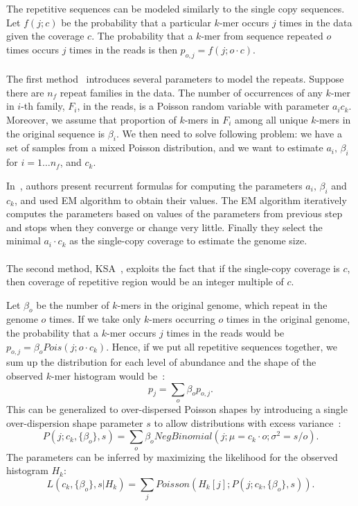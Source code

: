 The repetitive sequences can be modeled similarly to the single copy sequences. Let $f(j; c)$ be the probability that a particular $k$-mer occurs $j$ times in the data given the coverage $c$. The probability that a $k$-mer from sequence repeated $o$ times occurs $j$ times in the reads is then $p_{o,j} = f(j; o\cdot c)$.

\paragraph{}
The first method~\cite{waterman} introduces several parameters to model the repeats.
Suppose there are $n_f$ repeat families in the data. The number of occurrences of any $k$-mer in $i$-th family, $F_i$, in the reads, is a Poisson random variable with parameter $a_i c_k$. Moreover, we assume that proportion of $k$-mers in $F_i$ among all unique $k$-mers in the original sequence is $\beta_i$.
We then need to solve following problem: we have a set of samples from a mixed Poisson distribution, and we want to estimate $a_i,\,\beta_i$ for $i = 1\dots n_f$, and $c_k$.

In~\cite{waterman}, authors present recurrent formulas for computing the parameters $a_i,\, \beta_i$ and $c_k$, and used EM algorithm to obtain their values. The EM algorithm iteratively computes the parameters based on values of the parameters from previous step and stops when they converge or change very little. Finally they select the minimal $a_i \cdot c_k$ as the single-copy coverage to estimate the genome size.

\paragraph{}The second method, KSA~\cite{williams}, exploits the fact that if the single-copy coverage is $c$, then coverage of repetitive region would be an integer multiple of $c$.

Let $\beta_o$ be the number of $k$-mers in the original genome, which repeat in the genome $o$ times.
If we take only $k$-mers occurring $o$ times in the original genome, the probability that a $k$-mer occurs $j$ times in the reads would be $p_{o,j} = \beta_o Pois(j; o \cdot c_k)$.
Hence, if we put all repetitive sequences together, we sum up the distribution for each level of abundance and the shape of the observed $k$-mer histogram would be~\cite{williams}:
$$p_j = \sum_o \beta_o p_{o,j}.$$
This can be generalized to over-dispersed Poisson shapes by introducing a single over-dispersion shape parameter $s$ to allow distributions with excess variance~\cite{williams}:
$$P(j; c_k, \{\beta_o\}, s) = \sum_o \beta_o NegBinomial(j; \mu=c_k\cdot o;\sigma^2=s/o).$$
The parameters can be inferred by maximizing the likelihood for the observed histogram $H_k$:
$$L(c_k, \{\beta_o\}, s | H_k) = \sum_j Poisson(H_k[j]; P(j; c_k, \{\beta_o\}, s)).$$


